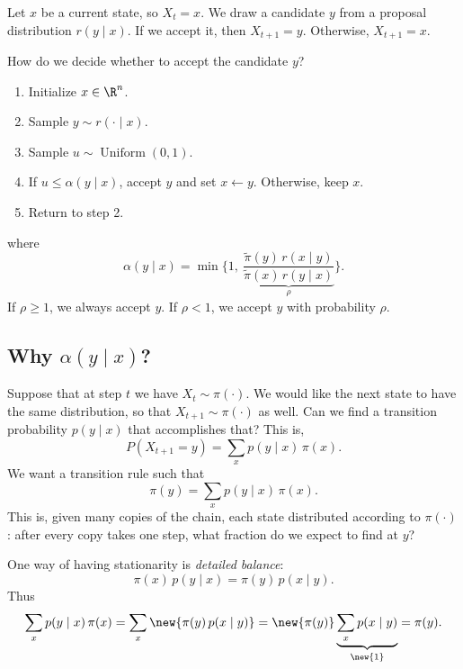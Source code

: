 Let $x$ be a current state, so $X_t = x$. We draw a candidate $y$ from a proposal distribution $r(y \mid x)$. If we accept it, then $X_{t+1} = y$. Otherwise, $X_{t+1} = x$.

How do we decide whether to accept the candidate $y$?
\begin{enumerate}
\item Initialize $x \in \R^n$.
\item Sample $y \sim r(\cdot \mid x)$.
\item Sample $u \sim \operatorname{Uniform}(0,1)$.
\item If $u \le \alpha(y \mid x)$, accept $y$ and set $x \leftarrow y$. Otherwise, keep $x$.
\item Return to step 2.
\end{enumerate}
where
\[
\alpha(y \mid x) = \min\Bigg\{1,\ \underbrace{\frac{\tilde\pi(y)\,r(x \mid y)}{\tilde\pi(x)\,r(y \mid x)}}_{\rho}\Bigg\}.
\]
If $\rho \ge 1$, we always accept $y$. If $\rho < 1$, we accept $y$ with probability $\rho$.

\subsection{Why $\alpha(y \mid x)$?}
Suppose that at step $t$ we have $X_t \sim \pi(\cdot)$. We would like the next state to have the same distribution, so that $X_{t+1} \sim \pi(\cdot)$ as well. Can we find a transition probability $p(y \mid x)$ that accomplishes that? This is,
\[
P(X_{t+1} = y) = \sum_x p(y \mid x)\,\pi(x).
\]
We want a transition rule such that
\[
\pi(y) = \sum_x p(y \mid x)\,\pi(x).
\]
This is, given many copies of the chain, each state distributed according to $\pi(\cdot)$: after every copy takes one step, what fraction do we expect to find at $y$?

One way of having stationarity is \emph{detailed balance}:
\[
\pi(x)\,p(y \mid x) = \pi(y)\,p(x \mid y).
\]
Thus
\[
\sum_x p(y \mid x)\,\pi(x) = \sum_x \new{\pi(y)\,p(x \mid y)} = \new{\pi(y)}\underbrace{\sum_x p(x \mid y)}_{\new{1}} = \pi(y).
\]

